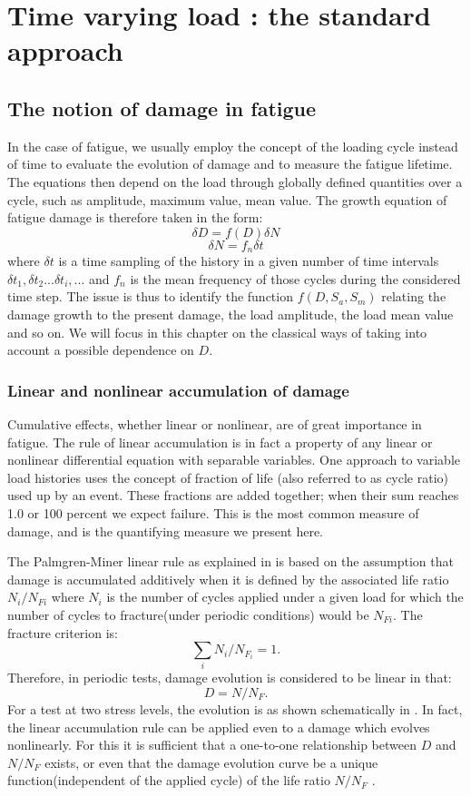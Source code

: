 \chapter{Time varying load : the standard approach}\label{chp:4}
\minitoc

\section{The notion of damage in fatigue}


In the case of fatigue, we usually employ the concept of the loading cycle instead of time to evaluate the evolution of damage and to measure the fatigue lifetime. The equations then depend on the load through globally defined quantities over a cycle, such as amplitude, maximum value, mean value.
The growth equation of fatigue damage is therefore taken in the form:
$$\delta D=f(D)\delta N$$
$$\delta N=f_n\delta t$$
where $\delta t$ is a time sampling of the history in a given number of time intervals $\delta t_1,\delta t_2 ... \delta t_i, ...$ and $f_n$ is the mean frequency of those cycles during the considered time step. The issue is thus to identify the function $f(D,S_a,S_m)$ relating the damage growth to the present damage, the load amplitude, the load mean value and so on. We will focus in this chapter on the classical ways of taking into account a possible dependence on $D$.

\subsection{Linear and nonlinear accumulation of damage}
Cumulative effects, whether linear or nonlinear, are of great importance in fatigue. The rule of linear accumulation is in fact a property of any linear or nonlinear differential equation with separable variables. One approach to variable load histories uses the concept of fraction of life (also referred to as cycle ratio) used up by an event. These fractions are added together; when their sum reaches 1.0 or 100 percent we expect failure. This is the most common measure of damage, and is the quantifying measure we present here. 

The Palmgren-Miner linear rule as explained in \cite{lemaitre1990mechanics} is based on the assumption that damage is accumulated additively when it is defined by the associated life ratio $N_i/N_{Fi}$ where $N_i$ is the number of cycles applied under a given load for which the number of cycles to fracture(under periodic conditions) would be $N_{Fi}$. The fracture criterion is:
$$\sum_{i}N_i/N_{F_i}=1.$$
Therefore, in periodic tests, damage evolution is considered to be linear in that:
$$D=N/N_F.$$
For a test at two stress levels, the evolution is as shown schematically in . In fact, the linear accumulation rule can be applied even to a damage which evolves nonlinearly. For this it is sufficient that a one-to-one relationship between $D$ and $N/N_F$ exists, or even that the damage evolution curve be a unique function(independent of the applied cycle) of the life ratio $N/N_F$ . 


